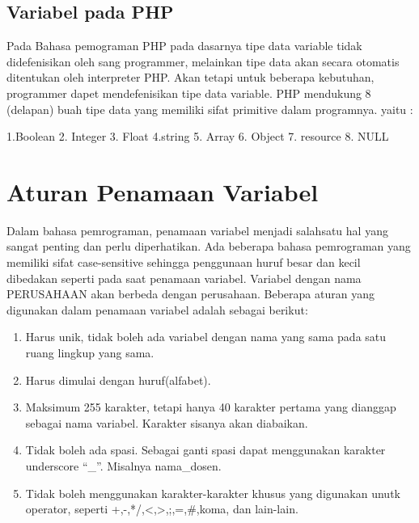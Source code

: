 \subsection{Variabel pada PHP}

Pada Bahasa pemograman PHP pada dasarnya tipe data variable tidak didefenisikan oleh sang programmer, melainkan tipe data akan secara 
otomatis ditentukan oleh interpreter PHP. Akan tetapi untuk beberapa kebutuhan, programmer dapet mendefenisikan tipe data variable. 
PHP mendukung 8 (delapan) buah tipe data yang memiliki sifat primitive dalam programnya. yaitu :
\begin{enumerate}
1.Boolean
2. Integer
3. Float
4.string 
5. Array
6. Object
7. resource
8. NULL
\end{enumerate}

\section{Aturan Penamaan Variabel}
Dalam bahasa pemrograman, penamaan variabel menjadi salahsatu hal yang sangat penting dan perlu diperhatikan. 
Ada beberapa bahasa pemrograman yang memiliki sifat case-sensitive sehingga penggunaan huruf besar dan kecil dibedakan seperti pada saat penamaan variabel. Variabel dengan nama PERUSAHAAN akan berbeda dengan perusahaan. 
Beberapa aturan yang  digunakan dalam penamaan variabel adalah sebagai berikut:
\begin{enumerate}
\item Harus unik, tidak boleh ada variabel dengan nama yang sama pada satu ruang lingkup yang sama.
\item Harus dimulai dengan huruf(alfabet).
\item Maksimum 255 karakter, tetapi hanya 40 karakter pertama yang dianggap sebagai nama variabel. Karakter sisanya akan diabaikan.
\item Tidak boleh ada spasi. Sebagai ganti spasi dapat menggunakan karakter underscore “_”. Misalnya nama_dosen.
\item Tidak boleh menggunakan karakter-karakter khusus yang digunakan unutk operator, seperti +,-,*/,<,>,;,=,#,koma, dan lain-lain.
\end{enumerate}

